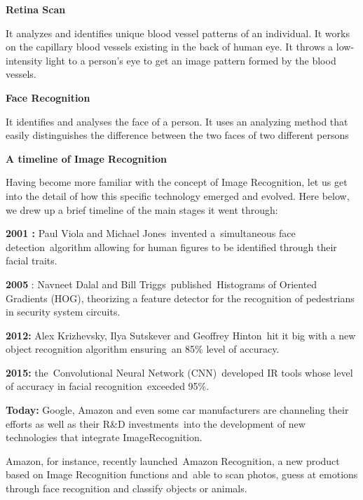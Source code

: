 \documentclass{article} %
\begin{document}
\noindent \textbf{}

\noindent \textbf{Retina Scan}

\noindent It analyzes and identifies unique blood vessel patterns of an individual. It works on the capillary blood vessels existing in the back of human eye. It throws a low-intensity light to a person's eye to get an image pattern formed by the blood vessels.

\noindent \textbf{Face Recognition}

\noindent It identifies and analyses the face of a person. It uses an analyzing method that easily distinguishes the difference between the two faces of two different persons

\noindent \textbf{}

\noindent \textbf{A timeline of Image Recognition}

\noindent Having become more familiar with the concept of Image Recognition, let us get into the detail of how this specific technology emerged and evolved. Here below, we drew up a brief timeline of the main stages it went through:

\noindent \textbf{2001 :} Paul Viola and Michael Jones~invented a~simultaneous face detection~algorithm allowing for human figures to be identified through their facial traits.

\noindent \textbf{2005} : Navneet Dalal and Bill Triggs~published~Histograms of Oriented Gradients (HOG), theorizing a feature detector for the recognition of pedestrians in security system circuits.

\noindent \textbf{2012:} Alex Krizhevsky, Ilya Sutskever and Geoffrey Hinton~hit it big with a new object recognition algorithm ensuring~an 85\% level of accuracy.

\noindent \textbf{2015:} the~Convolutional Neural Network (CNN)~developed IR tools whose level of accuracy in facial recognition~exceeded 95\%.

\noindent 

\noindent \textbf{Today:} Google, Amazon and even some car manufacturers are channeling their efforts as well as their R\&D investments~into the development of new technologies that integrate ImageRecognition.

\noindent Amazon, for instance, recently launched~Amazon Recognition, a new product based on Image Recognition functions and~able to scan photos, guess at emotions through face recognition and classify objects or animals.

\noindent 
\end{document}
